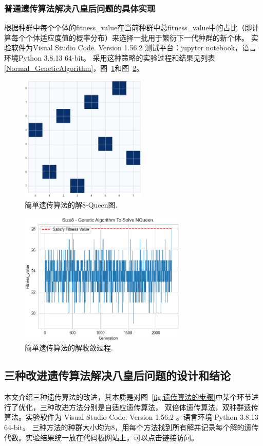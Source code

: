 \documentclass[12pt,a4paper,UTF8]{ctexart}
\begin{document}
\subsubsection{普通遗传算法解决八皇后问题的具体实现}
根据种群中每个个体的fitness\_value在当前种群中总fitness\_value中的占比（即计算每个个体适应度值的概率分布）来选择一批用于繁衍下一代种群的新个体。
实验软件为Visual Studio Code. Version 1.56.2 测试平台：jupyter notebook，语言环境Python 3.8.13 64-bit。
采用这种策略的实验过程和结果见列表\ref{Normal_GeneticAlgorithm}，图~\ref{fig:简单遗传算法的解8-Queen图}和图~\ref{fig:简单遗传算法的解收敛过程}。

\begin{figure}[htbp]
    \centering
    \includegraphics[width=6cm]{allpicture/queen100normal.eps}
    \caption{简单遗传算法的解8-Queen图.}
    \label{fig:简单遗传算法的解8-Queen图}
\end{figure}
\begin{figure}[htbp]
    \centering
    \includegraphics[width=8cm]{allpicture/generic100normal.eps}
    \caption{简单遗传算法的解收敛过程.}
    \label{fig:简单遗传算法的解收敛过程}
\end{figure}
\subsection{三种改进遗传算法解决八皇后问题的设计和结论}
本文介绍三种遗传算法的改进，其本质是对图~\ref{fig:遗传算法的步骤}中某个环节进行了优化，三种改进方法分别是自适应遗传算法，
双倍体遗传算法，双种群遗传算法\cite{王万良2011人工智能导论}。实验软件为 Visual Studio Code. Version 1.56.2 。语言环境 Python 3.8.13 64-bit。
三种方法的种群大小均为8，用每个方法找到所有解并记录每个解的遗传代数。实验结果统一放在代码板网站上，可以点击链接访问。
\end{document}
